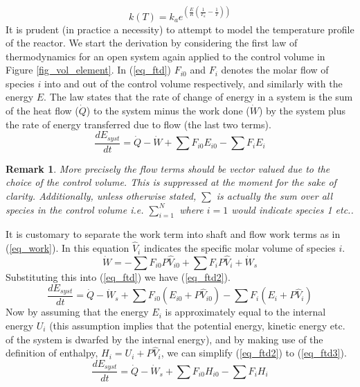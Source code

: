 \documentclass[11pt,fleqn]{article}
\theoremstyle{defstyle}
\newtheorem{rmrk}{Remark}[section]
\begin{document}
\begin{equation}
k(T) = k_a e^{(\frac{E}{R}(\frac{1}{T_a} - \frac{1}{T}))}
\label{eq_arrhenius}
\end{equation} 
It is prudent (in practice a necessity) to attempt to model the temperature profile of the reactor. We start the derivation by considering the first law of thermodynamics for an open system again applied to the control volume in Figure \ref{fig_vol_element}. In (\ref{eq_ftd}) $F_{i0}$ and $F_{i}$ denotes the molar flow of species $i$ into and out of the control volume respectively, and similarly with the energy $E$. The law states that the rate of change of energy in a system is the sum of the heat flow ($\dot{Q}$) to the system minus the work done ($\dot{W}$) by the system plus the rate of energy transferred due to flow (the last two terms). 
\begin{equation}
\frac{d E_{syst}}{dt} = \dot{Q} - \dot{W} + \sum F_{i0}E_{i0} -\sum F_{i}E_{i}
\label{eq_ftd}
\end{equation}
\begin{rmrk}
More precisely the flow terms should be vector valued due to the choice of the control volume. This is suppressed at the moment for the sake of clarity. Additionally, unless otherwise stated, $\sum$ is actually the sum over all species in the control volume i.e. $\sum_{i=1}^{N}$ where $i=1$ would indicate species 1 etc.. 
\end{rmrk}
It is customary to separate the work term into shaft and flow work terms as in (\ref{eq_work}). In this equation $\hat{V}_i$ indicates the specific molar volume of species $i$.
\begin{equation}
\dot{W} = -\sum F_{i0}P\hat{V}_{i0} + \sum F_{i}P\hat{V}_{i} + \dot{W}_s
\label{eq_work} 
\end{equation}
Substituting this into (\ref{eq_ftd}) we have (\ref{eq_ftd2}).
\begin{equation}
\frac{d E_{syst}}{dt} = \dot{Q} - \dot{W}_s + \sum F_{i0}(E_{i0}+P\hat{V}_{i0}) -\sum F_{i}(E_{i}+P\hat{V}_{i})
\label{eq_ftd2}
\end{equation}
Now by assuming that the energy $E_i$ is approximately equal to the internal energy $U_i$ (this assumption implies that the potential energy, kinetic energy etc. of the system is dwarfed by the internal energy), and by making use of the definition of enthalpy, $H_i = U_i + P\hat{V}_i$, we can simplify (\ref{eq_ftd2}) to (\ref{eq_ftd3}).
\begin{equation}
\frac{d E_{syst}}{dt} = \dot{Q} - \dot{W}_s + \sum F_{i0}H_{i0} -\sum F_{i}H_{i}
\label{eq_ftd3}
\end{equation} 
\end{document}
